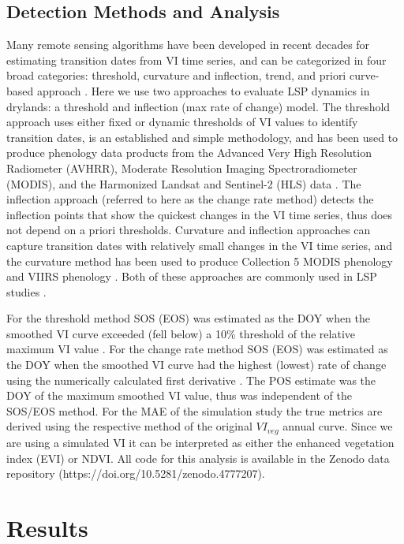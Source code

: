 \documentclass{article}
\begin{document}
\subsection{Detection Methods and Analysis}
Many remote sensing algorithms have been developed in recent decades for estimating transition dates from VI time series, and can be categorized in four broad categories: threshold, curvature and inflection, trend, and priori curve-based approach \cite{gao-zhang2021, zeng-wardlow2020}. Here we use two approaches to evaluate LSP dynamics in drylands: a threshold and inflection (max rate of change) model. The threshold approach uses either fixed or dynamic thresholds of VI values to identify transition dates, is an established and simple methodology, and has been used to produce phenology data products from the Advanced Very High Resolution Radiometer (AVHRR), Moderate Resolution Imaging Spectroradiometer (MODIS), and the Harmonized Landsat and Sentinel-2 (HLS) data \cite{jonsson2004, gray2019, bolton2020}. The inflection approach (referred to here as the change rate method) detects the inflection points that show the quickest changes in the VI time series, thus does not depend on a priori thresholds. Curvature and inflection approaches can capture transition dates with relatively small changes in the VI time series, and the curvature method has been used to produce Collection 5 MODIS phenology and VIIRS phenology \cite{zhang-friedl2003, zhang-liu2018}. Both of these approaches are commonly used in LSP studies \cite{garonna2016, jeong2011, buitenwerf2015}. 

For the threshold method SOS (EOS) was estimated as the DOY when the smoothed VI curve exceeded (fell below) a 10\% threshold of the relative maximum VI value \cite{white2007}. For the change rate method SOS (EOS) was estimated as the DOY when the smoothed VI curve had the highest (lowest) rate of change using the numerically calculated first derivative \cite{tateishi2004}. The POS estimate was the DOY of the maximum smoothed VI value, thus was independent of the SOS/EOS method. For the MAE of the simulation study the true metrics are derived using the respective method of the original $VI_{veg}$ annual curve. Since we are using a simulated VI it can be interpreted as either the enhanced vegetation index (EVI) or NDVI. All code for this analysis is available in the Zenodo data repository (https://doi.org/10.5281/zenodo.4777207).


\section{Results}
\end{document}
